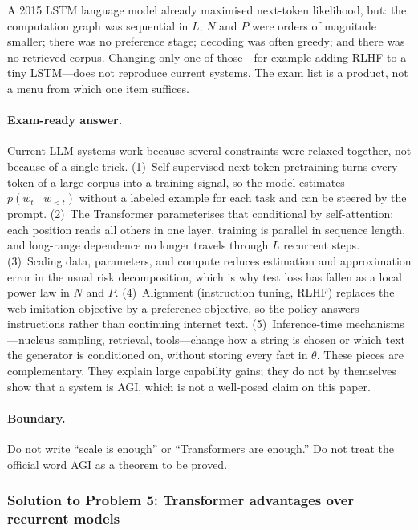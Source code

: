 \documentclass[11pt,a4paper]{article}
\theoremstyle{definition}
\begin{document}
\begin{example}
A 2015 LSTM language model already maximised next-token likelihood, but: the computation graph was sequential in \(L\); \(N\) and \(P\) were orders of magnitude smaller; there was no preference stage; decoding was often greedy; and there was no retrieved corpus. Changing only one of those---for example adding RLHF to a tiny LSTM---does not reproduce current systems. The exam list is a product, not a menu from which one item suffices.
\end{example}

\paragraph{Exam-ready answer.}
Current LLM systems work because several constraints were relaxed together, not because of a single trick. (1)~Self-supervised next-token pretraining turns every token of a large corpus into a training signal, so the model estimates \(p(w_t\mid w_{<t})\) without a labeled example for each task and can be steered by the prompt. (2)~The Transformer parameterises that conditional by self-attention: each position reads all others in one layer, training is parallel in sequence length, and long-range dependence no longer travels through \(L\) recurrent steps. (3)~Scaling data, parameters, and compute reduces estimation and approximation error in the usual risk decomposition, which is why test loss has fallen as a local power law in \(N\) and \(P\). (4)~Alignment (instruction tuning, RLHF) replaces the web-imitation objective by a preference objective, so the policy answers instructions rather than continuing internet text. (5)~Inference-time mechanisms---nucleus sampling, retrieval, tools---change how a string is chosen or which text the generator is conditioned on, without storing every fact in \(\theta\). These pieces are complementary. They explain large capability gains; they do not by themselves show that a system is AGI, which is not a well-posed claim on this paper.

\paragraph{Boundary.}
Do not write ``scale is enough'' or ``Transformers are enough.'' Do not treat the official word AGI as a theorem to be proved.

\subsubsection{Solution to Problem 5: Transformer advantages over recurrent models}
\end{document}
